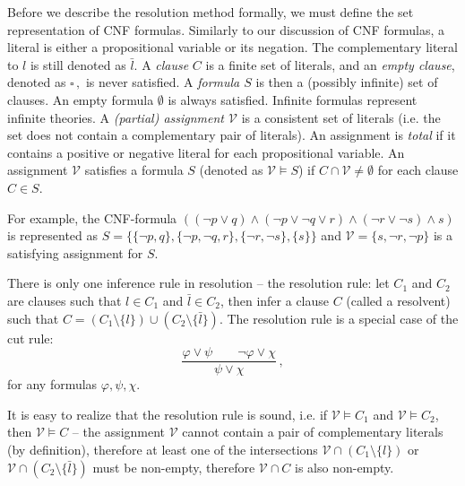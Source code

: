 Before we describe the resolution method formally, we must define the set representation of CNF formulas. Similarly to our discussion of CNF formulas, a literal is either a propositional variable or its negation. The complementary literal to $l$ is still denoted as $\bar{l}$. A \emph{clause} $C$ is a finite set of literals, and an \emph{empty clause}, denoted as $\square\,,$ is never satisfied. A \emph{formula $S$} is then a (possibly infinite) set of clauses. An empty formula $\emptyset$ is always satisfied. Infinite formulas represent infinite theories. A \emph{(partial) assignment $\mathcal{V}$} is a consistent set of literals (i.e. the set does not contain a complementary pair of literals). An assignment is \emph{total} if it contains a positive or negative literal for each propositional variable. An assignment $\mathcal{V}$ satisfies a formula $S$ (denoted as $\mathcal{V} \vDash S$) if $C \cap \mathcal{V} \neq \emptyset$ for each clause $C \in S$.

For example, the CNF-formula $((\neg p \lor q) \land (\neg p \lor \neg q \lor r) \land (\neg r \lor \neg s) \land s)$ is represented as $S = \{\{\neg p, q\}, \{\neg p, \neg q, r\}, \{\neg r, \neg s\}, \{s\}\}$ and $\mathcal{V} = \{s, \neg r, \neg p\}$ is a satisfying assignment for $S$.


There is only one inference rule in resolution -- the resolution rule: let $C_1$ and $C_2$ are clauses such that $l \in C_1$ and $\bar{l} \in C_2$, then infer a clause $C$ (called a resolvent) such that $C = (C_1 \setminus \{l\}) \cup (C_2 \setminus \{\bar{l}\})$. The resolution rule is a special case of the cut rule: $$\frac{\varphi \lor \psi \qquad \neg \varphi \lor \chi}{\psi \lor \chi}\,,$$ for any formulas $\varphi, \psi, \chi$. 

It is easy to realize that the resolution rule is sound, i.e. if $\mathcal{V} \vDash C_1$ and $\mathcal{V} \vDash C_2$, then $\mathcal{V} \vDash C$ -- the assignment $\mathcal{V}$ cannot contain a pair of complementary literals (by definition), therefore at least one of the intersections $\mathcal{V} \cap (C_1 \setminus \{l\})$ or $\mathcal{V} \cap (C_2 \setminus \{\bar{l}\})$ must be non-empty, therefore $\mathcal{V} \cap C$ is also non-empty.

